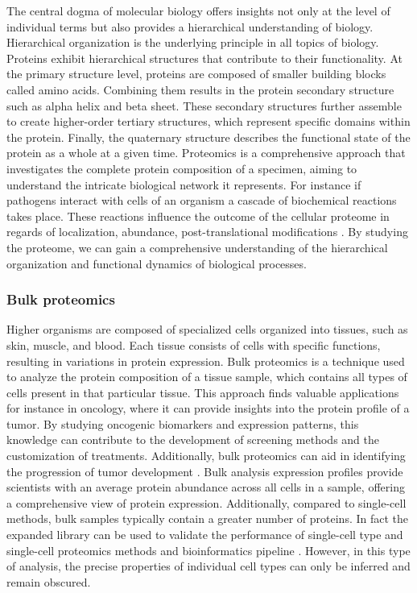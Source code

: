 \documentclass[
  11pt,
]{article}
\begin{document}
The central dogma of molecular biology offers insights not only at the level of individual terms but also provides a hierarchical understanding of biology. Hierarchical organization is the underlying principle in all topics of biology. Proteins exhibit hierarchical structures that contribute to their functionality. At the primary structure level, proteins are composed of smaller building blocks called amino acids. Combining them results in the protein secondary structure such as alpha helix and beta sheet. These secondary structures further assemble to create higher-order tertiary structures, which represent specific domains within the protein. Finally, the quaternary structure describes the functional state of the protein as a whole at a given time.
Proteomics is a comprehensive approach that investigates the complete protein composition of a specimen, aiming to understand the intricate biological network it represents. For instance if pathogens interact with cells of an organism a cascade of biochemical reactions takes place. These reactions influence the outcome of the cellular proteome in regards of localization, abundance, post-translational modifications \citep{Beltran2017}.
By studying the proteome, we can gain a comprehensive understanding of the hierarchical organization and functional dynamics of biological processes.

\hypertarget{bulk-proteomics}{%
\subsubsection{Bulk proteomics}\label{bulk-proteomics}}

Higher organisms are composed of specialized cells organized into tissues, such as skin, muscle, and blood. Each tissue consists of cells with specific functions, resulting in variations in protein expression. Bulk proteomics is a technique used to analyze the protein composition of a tissue sample, which contains all types of cells present in that particular tissue. This approach finds valuable applications for instance in oncology, where it can provide insights into the protein profile of a tumor. By studying oncogenic biomarkers and expression patterns, this knowledge can contribute to the development of screening methods and the customization of treatments. Additionally, bulk proteomics can aid in identifying the progression of tumor development \citep{Kwon2021}. Bulk analysis expression profiles provide scientists with an average protein abundance across all cells in a sample, offering a comprehensive view of protein expression. Additionally, compared to single-cell methods, bulk samples typically contain a greater number of proteins. In fact the expanded library can be used to validate the performance of single-cell type and single-cell proteomics methods and bioinformatics pipeline \citep{Schoof2021}. However, in this type of analysis, the precise properties of individual cell types can only be inferred and remain obscured.
\end{document}
